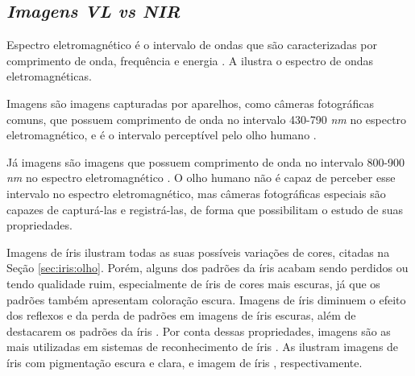 
\subsection{\textit{Imagens \acrfull{VL} vs \acrfull{NIR}}}

\par Espectro eletromagnético é o intervalo de ondas que são caracterizadas por comprimento de onda, frequência e energia \cite{gonsalez2006}. A  ilustra o espectro de ondas eletromagnéticas.

%

Imagens \textit{} são imagens capturadas por aparelhos, como câmeras fotográficas comuns, que possuem comprimento de onda no intervalo 430-790 \textit{nm} no espectro eletromagnético, e é o intervalo perceptível pelo olho humano \cite{gonsalez2006}.

\par Já imagens  são imagens que possuem comprimento de onda no intervalo 800-900 \textit{nm} no espectro eletromagnético \cite{gonsalez2006}. O olho humano não é capaz de perceber esse intervalo no espectro eletromagnético, mas câmeras fotográficas especiais são capazes de capturá-las e registrá-las, de forma que possibilitam o estudo de suas propriedades\cite{nir}.


\par Imagens \textit{} de íris ilustram todas as suas possíveis variações de cores, citadas na Seção \ref{sec:iris:olho}. Porém, alguns dos padrões da íris acabam sendo perdidos ou tendo qualidade ruim, especialmente de íris de cores mais escuras, já que os padrões também apresentam coloração escura. Imagens de íris  diminuem o efeito dos reflexos e da perda de padrões em imagens de íris escuras, além de destacarem os padrões da íris \cite{abdullah2015}. Por conta dessas propriedades, imagens  são as mais utilizadas em sistemas de reconhecimento de íris \cite{daugman2004}. As  ilustram imagens de íris \textit{} com pigmentação escura e clara, e imagem de íris \textit{}, respectivamente.

